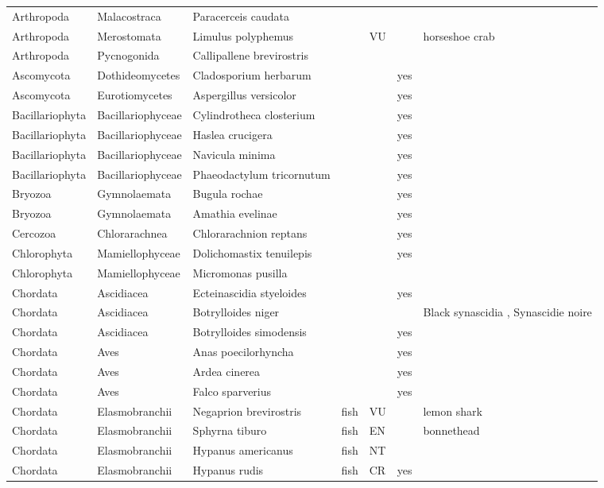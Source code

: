 \begin{longtable}{lllllll}
  Arthropoda & Malacostraca & Paracerceis caudata &  &  &  &  \\ 
  Arthropoda & Merostomata & Limulus polyphemus &  & VU &  & horseshoe crab \\ 
  Arthropoda & Pycnogonida & Callipallene brevirostris &  &  &  &  \\ 
  Ascomycota & Dothideomycetes & Cladosporium herbarum &  &  & yes &  \\ 
  Ascomycota & Eurotiomycetes & Aspergillus versicolor &  &  & yes &  \\ 
  Bacillariophyta & Bacillariophyceae & Cylindrotheca closterium &  &  & yes &  \\ 
  Bacillariophyta & Bacillariophyceae & Haslea crucigera &  &  & yes &  \\ 
  Bacillariophyta & Bacillariophyceae & Navicula minima &  &  & yes &  \\ 
  Bacillariophyta & Bacillariophyceae & Phaeodactylum tricornutum &  &  & yes &  \\ 
  Bryozoa & Gymnolaemata & Bugula rochae &  &  & yes &  \\ 
  Bryozoa & Gymnolaemata & Amathia evelinae &  &  & yes &  \\ 
  Cercozoa & Chlorarachnea & Chlorarachnion reptans &  &  & yes &  \\ 
  Chlorophyta & Mamiellophyceae & Dolichomastix tenuilepis &  &  & yes &  \\ 
  Chlorophyta & Mamiellophyceae & Micromonas pusilla &  &  &  &  \\ 
  Chordata & Ascidiacea & Ecteinascidia styeloides &  &  & yes &  \\ 
  Chordata & Ascidiacea & Botrylloides niger &  &  &  & Black synascidia , Synascidie noire \\ 
  Chordata & Ascidiacea & Botrylloides simodensis &  &  & yes &  \\ 
  Chordata & Aves & Anas poecilorhyncha &  &  & yes &  \\ 
  Chordata & Aves & Ardea cinerea &  &  & yes &  \\ 
  Chordata & Aves & Falco sparverius &  &  & yes &  \\ 
  Chordata & Elasmobranchii & Negaprion brevirostris & fish & VU &  & lemon shark \\ 
  Chordata & Elasmobranchii & Sphyrna tiburo & fish & EN &  & bonnethead \\ 
  Chordata & Elasmobranchii & Hypanus americanus & fish & NT &  &  \\ 
  Chordata & Elasmobranchii & Hypanus rudis & fish & CR & yes &  \\ 

\end{longtable}
